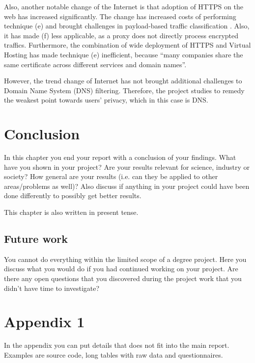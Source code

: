 \documentclass[a4paper,12pt]{article}
\begin{document}
Also, another notable change of the Internet is that adoption of HTTPS on the web has increased significantly\cite{felt2017measuring}.
The change has increased costs of performing technique (e) and brought challenges in payload-based traffic classification \cite{xue2013traffic}.
Also, it has made (f) less applicable, as a proxy does not directly process encrypted traffics\cite{shbair2015efficiently}.
Furthermore, the combination of wide deployment of HTTPS and Virtual Hosting has made technique (e) inefficient, because ``many companies share the same certificate across different services and domain names\cite{shbair2015efficiently}''.

However, the trend change of Internet has not brought additional challenges to Domain Name System (DNS) filtering. Therefore, the project studies to remedy the weakest point towards users' privacy, which in this case is DNS.

\newpage
		
\section{Conclusion}
In this chapter you end your report with a conclusion of your findings. What have you shown in your project? Are your results relevant for science, industry or society? How general are your results (i.e. can they be applied to other areas/problems as well)? Also discuss if anything in your project could have been done differently to possibly get better results. 

This chapter is also written in present tense.

\subsection{Future work}
You cannot do everything within the limited scope of a degree project. Here you discuss what you would do if you had continued working on your project. Are there any open questions that you discovered during the project work that you didn't have time to investigate?

\newpage


%
\newpage

\hypersetup{urlcolor=black}


\newpage
\setcounter{page}{1} %
\appendix

\section{Appendix 1} 
In the appendix you can put details that does not fit into the main report. Examples are source code, long tables with raw data and questionnaires.
\end{document}
